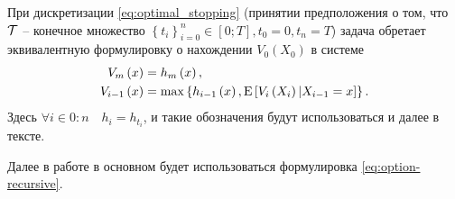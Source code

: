 При дискретизации \eqref{eq:optimal_stopping} (принятии предположения о том, что $\mathcal{T}$ -- конечное множество $\left\lbrace t_i\right\rbrace_{i=0}^n \in \left[0;T\right], t_0 = 0, t_n = T$) задача обретает эквивалентную формулировку о нахождении $V_0\left(X_0\right)$ в системе
\begin{equation}\label{eq:option-recursive}\begin{aligned}
            V_m\left(x\right) &= h_m\left(x\right), \\
            V_{i-1}\left(x\right) &= \max\left\lbrace h_{i-1}\left(x\right),\mathrm{E}\left[V_i\left(X_i\right)|X_{i-1}=x\right]\right\rbrace.
\end{aligned}\end{equation}
Здесь $\forall i \in{0\mathbin{:}n}\quad h_i = h_{t_i}$, и такие обозначения будут использоваться и далее в тексте.

Далее в работе в основном будет использоваться формулировка \eqref{eq:option-recursive}. 

